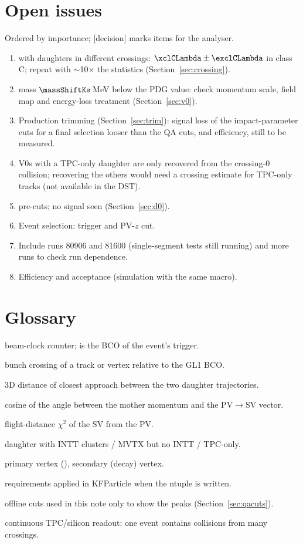 \section{Open issues}
\label{sec:open}
Ordered by importance; [decision] marks items for the analyser.
\begin{enumerate}\setlength\itemsep{1pt}
\item \Lam{} with daughters in different crossings: $\xclCLambda\pm\exclCLambda$ in class C; repeat
  with $\sim$10$\times$ the statistics (Section~\ref{sec:crossing}).
\item \Ks{} mass $\massShiftKs$\,MeV below the PDG value: check momentum scale, field map and
  energy-loss treatment (Section~\ref{sec:v0}).
\item Production trimming (Section~\ref{sec:trim}): signal loss of the impact-parameter cuts for a final
  selection looser than the QA cuts, and \Dzero{} efficiency, still to be measured.
\item V0s with a TPC-only daughter are only recovered from the crossing-0 collision; recovering the
  others would need a crossing estimate for TPC-only tracks (not available in the DST).
\item [decision] \Dzero{} pre-cuts; no signal seen (Section~\ref{sec:d0}).
\item [decision] Event selection: trigger and PV-$z$ cut.
\item Include runs 80906 and 81600 (single-segment tests still running) and more runs to check
  run dependence.
\item Efficiency and acceptance (simulation with the same macro).
\end{enumerate}

\section{Glossary}
\label{sec:glossary}
\begin{description}\setlength\itemsep{0pt}
\item[BCO] beam-clock counter;  is the BCO of the event's trigger.
\item[crossing ($X$)] bunch crossing of a track or vertex relative to the GL1 BCO.
\item[DCA$_{12}$] 3D distance of closest approach between the two daughter trajectories.
\item[DIRA] cosine of the angle between the mother momentum and the PV$\to$SV vector.
\item[FD $\chi^2$] flight-distance $\chi^2$ of the SV from the PV.
\item[I / M / T] daughter with INTT clusters / MVTX but no INTT / TPC-only.
\item[PV, SV] primary vertex (), secondary (decay) vertex.
\item[pre-cuts] requirements applied in KFParticle when the ntuple is written.
\item[QA cuts] offline cuts used in this note only to show the peaks (Section~\ref{sec:qacuts}).
\item[streaming readout] continuous TPC/silicon readout: one event contains collisions from many crossings.
\end{description}
